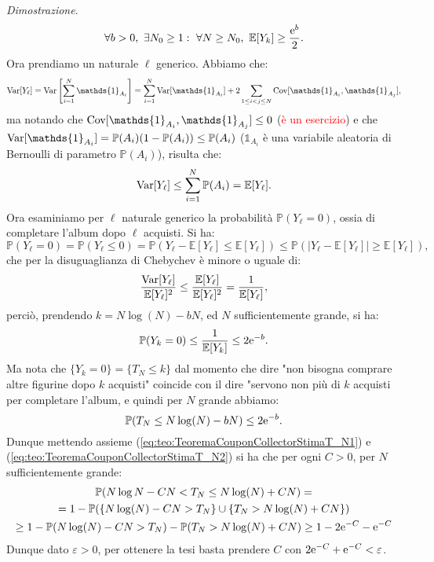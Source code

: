 \documentclass[11pt]{book}
\makeatletter
\theoremstyle{Definizione}
\theoremstyle{TeoremaProposizioneLemmaCorollario}
\theoremstyle{OsservazioneNota}
\renewenvironment{proof}[1][\proofname]{\par
  \normalfont \topsep6\p@\@plus6\p@\relax
  \trivlist
  \item[\hskip\labelsep
        \itshape
    #1\@addpunct{.}]\ignorespaces
}{%
  \endtrivlist\@endpefalse
}
\renewcommand{\P}{\mathbb{P}}
\newcommand{\e}{\textup{e}}
\newcommand{\E}{\mathbb{E}}
\newcommand{\Cov}{\textup{Cov}}
\newcommand{\Var}{\textup{Var}}
\newcommand{\uno}[1]{\mathds{1}_{#1}}
\renewenvironment{proof}{\textsl{Dimostrazione}.}{}
\makeatother
\begin{document}
\begin{boxteo}{}
\begin{proof}
\begin{equation}\label{eq:teo:TeoremaCouponCollectorStimaE[Y_k]}
\forall b > 0,\ \exists N_0\geq 1:\ \forall N \geq N_0,\ \E[Y_k] \geq \frac{\e^{b}}{2}.
\end{equation}
Ora prendiamo un naturale $\ell$ generico. Abbiamo che:
$$
\Var[Y_\ell] = \Var\left[\sum_{i = 1}^N \uno{A_i}\right] = \sum_{i = 1}^N \Var[\uno{A_i}] + 2 \sum_{1\leq i < j \leq N} \Cov[\uno{A_i},\uno{A_j}],
$$
ma notando che $\Cov[\uno{A_i},\uno{A_j}] \leq 0$ (\textcolor{red}{è un esercizio}) e che $\Var[\uno{A_i}] = \P(A_i)(1-\P(A_i))\leq \P(A_i)$ ($\uno{A_i}$ è una variabile aleatoria di Bernoulli di parametro $\P(A_i)$), risulta che:
\begin{equation}\label{eq:teo:TeoremaCouponCollectorStimaVarianza}
\Var[Y_\ell] \leq \sum_{i = 1}^N \P(A_i) = \E[Y_\ell].
\end{equation}
Ora esaminiamo per $\ell$ naturale generico la probabilità $\P(Y_\ell = 0)$, ossia di completare l'album dopo $\ell$ acquisti. Si ha:
$$
\P(Y_\ell = 0) = \P(Y_\ell \leq 0) = \P(Y_\ell - \E[Y_\ell] \leq \E[Y_\ell]) \leq \P(|Y_\ell-\E[Y_\ell]| \geq \E[Y_\ell]),
$$
che per la disuguaglianza di Chebychev è minore o uguale di:
$$
\frac{\Var[Y_\ell]}{\E[Y_\ell]^2} \leq \frac{\E[Y_\ell]}{\E[Y_\ell]^2} = \frac{1}{\E[Y_\ell]},
$$
perciò, prendendo $k = N\log(N)-bN$, ed $N$ sufficientemente grande, si ha:
$$
\P(Y_k = 0) \leq \frac{1}{\E[Y_k]} \leq 2\e^{-b}.
$$
Ma nota che $\{Y_k = 0\} = \{T_N \leq k\}$ dal momento che dire "non bisogna comprare altre figurine dopo $k$ acquisti" coincide con il dire "servono non più di $k$ acquisti per completare l'album, e quindi per $N$ grande abbiamo:
\begin{equation}\label{eq:teo:TeoremaCouponCollectorStimaT_N2}
\P(T_N \leq N\log(N)-bN) \leq 2\e^{-b}.
\end{equation}
Dunque mettendo assieme (\ref{eq:teo:TeoremaCouponCollectorStimaT_N1}) e (\ref{eq:teo:TeoremaCouponCollectorStimaT_N2}) si ha che per ogni $C > 0$, per $N$ sufficientemente grande:
\begin{multline*}
\P(N \log N - CN < T_N \leq N\log(N)+CN) =\\
= 1- \P(\{N\log(N)-CN > T_N\}\cup\{T_N > N\log(N) + CN\})\\
\geq 1- \P(N\log(N) -CN > T_N) - \P(T_N > N\log(N)+CN) \geq 1- 2\e^{-C}-\e^{-C}
\end{multline*}
Dunque dato $\varepsilon > 0$, per ottenere la tesi basta prendere $C$ con $2\e^{-C}+\e^{-C} < \varepsilon$.
\end{proof}
\end{boxteo}
\end{document}
